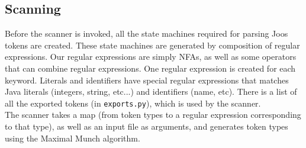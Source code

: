 \documentclass[12pt, a4paper]{article}
\begin{document}
\subsection{Scanning}

Before the scanner is invoked, all the state machines required for parsing Joos tokens are created. These state machines are generated by composition of regular expressions. Our regular expressions are simply NFAs, as well as some operators that can combine regular expressions. One regular expression is created for each keyword. Literals and identifiers have special regular expressions that matches Java literals (integers, string, etc...) and identifiers (name, etc). There is a list of all the exported tokens (in \verb|exports.py|), which is used by the scanner. \\

The scanner takes a map (from token types to a regular expression corresponding to that type), as well as an input file as arguments, and generates token types using the Maximal Munch algorithm. 
\end{document}
